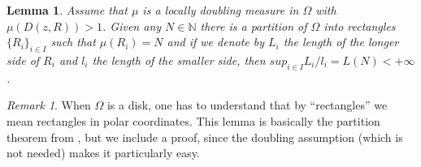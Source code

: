 \documentclass[12pt,twoside,final,psamsfonts]{amsart}
\theoremstyle{plain}
\newtheorem{lema}{Lemma}
\theoremstyle{remark}
\newtheorem*{remark}{Remark}
\theoremstyle{definition}
\newcommand{\N}{{\mathbb N}}
\begin{document}
\begin{lema}\label{partition}
Assume that $\mu$ is a locally doubling measure in $\Omega$ with
$\mu(D(z,R))>1$.
Given any $N\in \N$ there is  a partition of $\Omega$ into rectangles
$\{R_i\}_{i\in I}$ such  that  $\mu(R_i)=N$ and if we denote by $L_i$
the length of the longer side of $R_i$ and $l_i$ the 
length of the smaller side,
then  $sup_{i\in I} L_i/l_i=L(N)<+\infty$. 
\end{lema}

\begin{remark} When $\Omega$ is a disk, one has to understand that
by ``rectangles'' 
we mean rectangles in polar coordinates. This lemma is basically
the partition theorem from \cite{Yulmukhametov85}, but we include a proof, since
the doubling assumption (which is not needed) makes it particularly easy. 
\end{remark}
\end{document}

